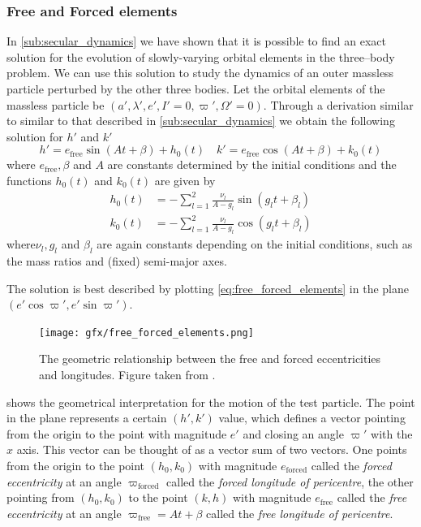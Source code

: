 \documentclass[twoside,openright,titlepage,numbers=noenddot,headinclude,%
                footinclude=true,cleardoublepage=empty,abstractoff, 
                BCOR=5mm,paper=a4,fontsize=11pt,%
                american,%
                ]{scrreprt}%
\begin{document}
\subsubsection*{Free and Forced elements}
In \cref{sub:secular_dynamics} we have shown that it is possible to 
find an exact solution for the evolution of slowly-varying
orbital elements in the three--body problem. We can use this solution
to study the dynamics of an outer massless particle perturbed by 
the other three bodies. Let the orbital elements of the massless
particle be $(a',\lambda',e',I'=0,\varpi',\Omega'=0)$. Through a
derivation similar to similar to that described in 
\cref{sub:secular_dynamics} \citep[see ch. 7 sec. 4 of][]{murray}
we obtain the following solution for $h'$ and $k'$
\begin{equation}
    h'=e_\text{free}\sin(At+\beta)+h_0(t)\quad
     k'=e_\text{free}\cos(At+\beta)+k_0(t)
     \label{eq:free_forced_elements}
\end{equation}
where $e_\text{free},\beta$ and $A$ are constants determined by
the initial conditions and the functions $h_0(t)$ and $k_0(t)$
are given by
\begin{align}
    h_0(t)&=-\sum^2_{l=1} \frac{\nu_l}{A-g_l} \sin(g_lt+\beta_l)\\
    k_0(t)&=-\sum^2_{l=1} \frac{\nu_l}{A-g_l} \cos(g_lt+\beta_l)
\end{align}
where$\nu_l,g_l$ and $\beta_l$ are again constants depending on 
the initial conditions, such as the mass ratios and (fixed)
semi-major axes. 

The solution is best described by plotting
\cref{eq:free_forced_elements} in the plane $(e'\cos\varpi',
e'\sin\varpi')$.
\begin{figure}[htb]
\centering
\texttt{[image: gfx/free\_forced\_elements.png]}
    \caption[Free and forced elements.]{The geometric relationship 
    between the free and forced
    eccentricities and longitudes. Figure taken from \citet{murray}.}
\label{fig:free_forced_elements}
\end{figure}
 shows the geometrical interpretation
for the motion of the test particle. The point in the plane represents
a certain $(h',k')$ value, which defines a vector pointing from the origin
to the point with magnitude $e'$ and closing an angle $\varpi'$ with
the $x$ axis. This vector can be thought of as a vector sum of two 
vectors. One points from the origin to the point $(h_0, k_0)$ 
with magnitude $e_\text{forced}$ called the \emph{forced eccentricity} 
at an angle $\varpi_\text{forced}$ called the \emph{forced longitude 
of pericentre},  
the other pointing from
$(h_0,k_0)$ to the point $(k,h)$ with magnitude $e_\text{free}$ called
the \emph{free eccentricity} 
at an angle $\varpi_\text{free}=At+\beta$ called the \emph{free
longitude of pericentre}. 
\end{document}
